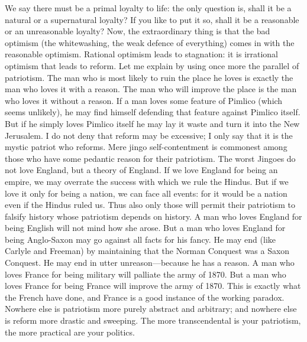 \documentclass{book}
\begin{document}
We say there must be a primal loyalty to life: the only question is, shall it be a natural or a supernatural loyalty? If you like to put it so, shall it be a reasonable or an unreasonable loyalty? Now, the extraordinary thing is that the bad optimism (the whitewashing, the weak defence of everything) comes in with the reasonable optimism. Rational optimism leads to stagnation: it is irrational optimism that leads to reform. Let me explain by using once more the parallel of patriotism. The man who is most likely to ruin the place he loves is exactly the man who loves it with a reason. The man who will improve the place is the man who loves it without a reason. If a man loves some feature of Pimlico (which seems unlikely), he may find himself defending that feature against Pimlico itself. But if he simply loves Pimlico itself he may lay it waste and turn it into the New Jerusalem. I do not deny that reform may be excessive; I only say that it is the mystic patriot who reforms. Mere jingo self-contentment is commonest among those who have some pedantic reason for their patriotism. The worst Jingoes do not love England, but a theory of England. If we love England for being an empire, we may overrate the success with which we rule the Hindus. But if we love it only for being a nation, we can face all events: for it would be a nation even if the Hindus ruled us. Thus also only those will permit their patriotism to falsify history whose patriotism depends on history. A man who loves England for being English will not mind how she arose. But a man who loves England for being Anglo-Saxon may go against all facts for his fancy. He may end (like Carlyle and Freeman) by maintaining that the Norman Conquest was a Saxon Conquest. He may end in utter unreason—because he has a reason. A man who loves France for being military will palliate the army of 1870. But a man who loves France for being France will improve the army of 1870. This is exactly what the French have done, and France is a good instance of the working paradox. Nowhere else is patriotism more purely abstract and arbitrary; and nowhere else is reform more drastic and sweeping. The more transcendental is your patriotism, the more practical are your politics.
\end{document}
